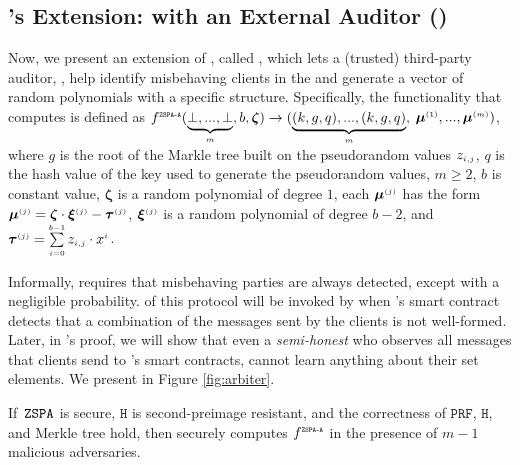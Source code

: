 




\vspace{-2mm}

\subsection{\zspa's Extension: \zspa with an External Auditor (\zspaa)}
\vspace{-1mm}

Now, we present an extension of \zspa, called \zspaa, which lets a (trusted) third-party auditor, \aud, help identify misbehaving clients in the \zspa and generate a vector of random polynomials with a specific structure. Specifically, the functionality that \zspaa computes is defined as 
%
$f^{\scriptscriptstyle \mathtt{ZSPA\text{-}A}}(\underbrace{\bot,..., \bot}_{\scriptscriptstyle m}, b, \bm\zeta)\rightarrow (\underbrace{(k, g, q),..., (k, g,q)}_{\scriptscriptstyle m},$ $\bm\mu^{\scriptscriptstyle (1)},..., \bm\mu^{\scriptscriptstyle (m)})$, where $g$ is the root of the Markle tree built on the pseudorandom values $z_{\scriptscriptstyle i, j}$, $q$ is the hash value of the key used to generate the pseudorandom values, $m\geq 2$, $b$ is constant value, $\bm\zeta$ is a random polynomial of degree $1$, each $\bm\mu^{\scriptscriptstyle (j)} $ has the form $\bm\mu^{\scriptscriptstyle (j)} = \bm\zeta\cdot \bm\xi^{\scriptscriptstyle (j)}-\bm\tau^{\scriptscriptstyle (j)}$,  $\bm\xi^{\scriptscriptstyle (j)}$ is a random polynomial of degree $b-2$, and $\bm\tau^{\scriptscriptstyle (j)}=\sum\limits^{\scriptscriptstyle b-1}_{\scriptscriptstyle i=0}z_{\scriptscriptstyle i,j}\cdot x^{\scriptscriptstyle i}$. 



Informally, \zspaa requires that misbehaving parties are always detected, except with a negligible probability. \aud of this protocol will be invoked by \withFai when \withFai's smart contract detects that a combination of the messages sent by the clients is not well-formed. Later, in \withFai's proof, we will show that even a \emph{semi-honest} \aud who observes all messages that clients send to \withFai's smart contracts, cannot learn anything about their set elements. We present \zspaa in Figure \ref{fig:arbiter}. 

\vspace{-3mm}



\vspace{-2mm}
\begin{theorem}\label{theorem::ZSPA-A}
If\ $\mathtt{ZSPA}$ is secure, $\mathtt{H}$ is second-preimage resistant, and the correctness of $\mathtt{PRF}$, $\mathtt{H}$, and Merkle tree hold,  then \zspaa securely computes $f^{\scriptscriptstyle \mathtt{ZSPA\text{-}A}}$ in the presence of $m-1 $ malicious adversaries.%
\end{theorem}

